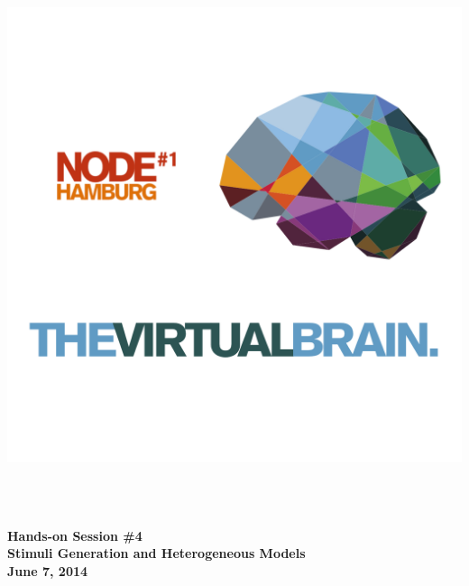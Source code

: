 \thispagestyle{plain}
\begin{titlepage}
\begin{center}
\includegraphics[width=1.5\textwidth]{./tvb_logo_transparent_square.png}~\\[0.5cm]

\begin{fullwidth}
\HRule \\[0.2cm]
\begin{center}
{ \huge \bfseries Hands-on Session \#4 \\ [0.2cm] Stimuli Generation and Heterogeneous Models \\[0.1cm] }
{ \large \bfseries June 7, 2014 \\[0.2cm]}
\end{center}
\HRule \\[0.2cm]
\end{fullwidth}

\end{center}
\end{titlepage}